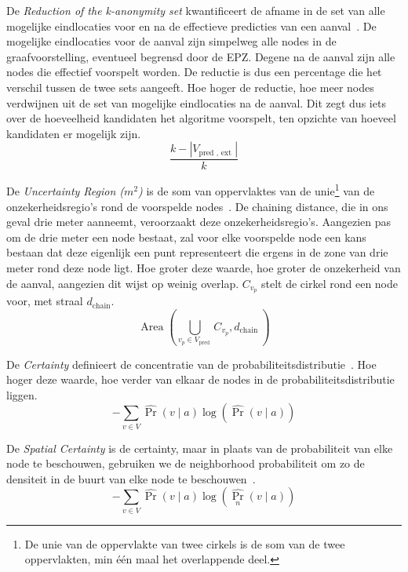 De \textit{Reduction of the k-anonymity set} kwantificeert de afname in de set
van alle mogelijke eindlocaties voor en na de effectieve predicties van een
aanval~\cite{Dhondt, Verdonck_2022}. De mogelijke eindlocaties voor de aanval
zijn simpelweg alle nodes in de graafvoorstelling, eventueel begrensd door de
\ac{EPZ}. Degene na de aanval zijn alle nodes die effectief voorspelt worden.
De reductie is dus een percentage die het verschil tussen de twee sets
aangeeft. Hoe hoger de reductie, hoe meer nodes verdwijnen uit de set van
mogelijke eindlocaties na de aanval. Dit zegt dus iets over de hoeveelheid
kandidaten het algoritme voorspelt, ten opzichte van hoeveel kandidaten er
mogelijk zijn.
\begin{equation}
    \frac{k-\left|V_{\text {pred }, \text { ext }}\right|}{k}\label{eq:reduction}
\end{equation}

De \textit{Uncertainty Region ($m^2$)} is de som van oppervlaktes van de
unie\footnote{De unie van de oppervlakte van twee cirkels is de som van de twee
    oppervlakten, min één maal het overlappende deel.} van de onzekerheidsregio's
rond de voorspelde nodes~\cite{Dhondt,Verdonck_2022}. De chaining distance, die
in ons geval drie meter aanneemt, veroorzaakt deze onzekerheidsregio's.
Aangezien pas om de drie meter een node bestaat, zal voor elke voorspelde node
een kans bestaan dat deze eigenlijk een punt representeert die ergens in de
zone van drie meter rond deze node ligt. Hoe groter deze waarde, hoe groter de
onzekerheid van de aanval, aangezien dit wijst op weinig overlap. $C_{v_p}$
stelt de cirkel rond een node voor, met straal $d_{\text{chain}}$.
\begin{equation}
    \operatorname{Area}\left(\bigcup_{v_p \in V_{\text {pred }}} C_{v_p}, d_{\text {chain }}\right)\label{eq:uncertainty}
\end{equation}

De \textit{Certainty} definieert de concentratie van de
probabiliteitsdistributie~\cite{Dhondt}. Hoe hoger deze waarde, hoe verder van
elkaar de nodes in de probabiliteitsdistributie liggen.
\begin{equation}
    -\sum_{v \in V} \widehat{\operatorname{Pr}}(v \mid a) \log (\widehat{\operatorname{Pr}}(v \mid a))\label{eq:certainty}
\end{equation}

De \textit{Spatial Certainty} is de certainty, maar in plaats van de
probabiliteit van elke node te beschouwen, gebruiken we de neighborhood
probabiliteit om zo de densiteit in de buurt van elke node te
beschouwen~\cite{Dhondt}.
\begin{equation}
    -\sum_{v \in V} \widehat{\operatorname{Pr}}(v \mid a) \log \left(\widehat{\operatorname{Pr}_n}(v \mid a)\right)\label{eq:spatial_certainty}
\end{equation}

